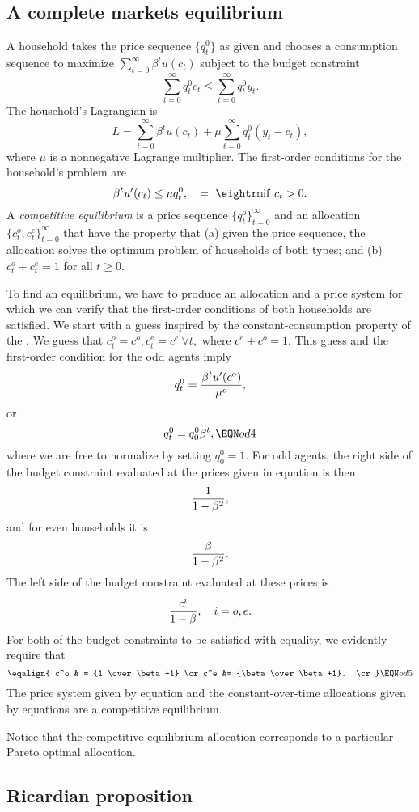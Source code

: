 \subsection{A complete markets equilibrium}
A household takes the price sequence $\{ q_t^0\}$ as given
and chooses a consumption sequence to maximize
$\sum_{t=0}^\infty \beta^t u(c_t)$ subject to
the budget constraint
$$ \sum_{t=0}^\infty q_t^0 c_t \leq \sum_{t=0}^\infty q_t^0 y_t .$$
The household's Lagrangian is
$$ L = \sum_{t=0}^\infty \beta^t u(c_t)
+ \mu  \sum_{t=0}^\infty q_t^0 (y_t - c_t) ,$$
where $\mu$ is a nonnegative Lagrange multiplier.
The first-order conditions for the household's problem
are
$$ \beta^t u'(c_t) \leq \mu q_t^0 , \quad = \ {\rm if} \ c_t > 0 .$$
\medskip
{}  A {\it competitive equilibrium}
is a price sequence $\{q_t^o\}_{t=0}^\infty$ and an allocation
$\{c_t^o, c_t^e\}_{t=0}^\infty$ that have the property that
(a) given the price sequence, the allocation solves
the optimum problem of households of both types; and (b) $c^o_t+c^e_t=1$
for all $t\geq 0$.

\medskip
To find an equilibrium, we have to produce an allocation and a price system
for which we can verify that the first-order conditions of both households
are satisfied.  We start with a guess inspired by the constant-consumption
property of the .  We guess that
$c_t^o = c^o, c_t^e = c^e \ \forall t,$
where $c^e+c^o =1$.  This guess and the first-order condition for the
odd agents imply
$$ q_t^0 = {\beta^t  u'(c^o) \over \mu^o},$$
or
$$ q_t^0 = q^0_0 \beta^t, \EQN od4$$
where we are free to normalize by setting $q^0_0 = 1.$
For odd agents, the right side of the budget constraint
evaluated at the prices given in equation  is then
$$ {1 \over 1 - \beta^2},$$
and for even households it is
$$ {\beta \over 1 - \beta^2}. $$
The left side of the budget constraint evaluated
at these prices is
$$ {c^i \over 1 - \beta}, \quad i = o,e  .$$
For both of the budget constraints to be satisfied with
equality,  we evidently require
that
$$ \eqalign{ c^o & = {1 \over \beta+1}  \cr
             c^e &= {\beta \over \beta+1}. \cr }  \EQN od5 $$
The price system given by equation  and the constant-over-time
allocations given by equations  are a competitive equilibrium.

Notice that the competitive equilibrium allocation corresponds to a particular
Pareto optimal allocation.
\subsection{Ricardian proposition}

